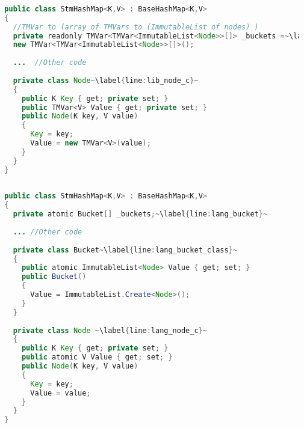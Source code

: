 \begin{lstlisting}[float,label=lst:lib_Buckets,
  caption={HashMap Buckets Array - \ac{STM} Library},
  language=Java,  
  showspaces=false,
  showtabs=false,
  breaklines=true,
  showstringspaces=false,
  breakatwhitespace=true,
  escapechar=~,
  commentstyle=\color{greencomments},
  keywordstyle=\color{bluekeywords},
  stringstyle=\color{redstrings},
  morekeywords={atomic, retry, orelse, var, get, set, ref, out, readonly}]  % Start your code-block
  
  public class StmHashMap<K,V> : BaseHashMap<K,V>
  {
    //TMVar to (array of TMVars to (ImmutableList of nodes) )
    private readonly TMVar<TMVar<ImmutableList<Node>>[]> _buckets =~\label{line:lib_bucket}~
    new TMVar<TMVar<ImmutableList<Node>>[]>();
  
    ...  //Other code
  
    private class Node~\label{line:lib_node_c}~
    {
      public K Key { get; private set; }
      public TMVar<V> Value { get; private set; }
      public Node(K key, V value)
      {
        Key = key;
        Value = new TMVar<V>(value);
      }
    }
  }
\end{lstlisting}

\begin{lstlisting}[float,label=lst:lang_Buckets,
  caption={HashMap Buckets Array - \stmname},
  language=Java,  
  showspaces=false,
  showtabs=false,
  breaklines=true,
  showstringspaces=false,
  breakatwhitespace=true,
  escapechar=~,
  commentstyle=\color{greencomments},
  keywordstyle=\color{bluekeywords},
  stringstyle=\color{redstrings},
  morekeywords={atomic, retry, orelse, var, get, set, ref, out}]  % Start your code-block
  
  public class StmHashMap<K,V> : BaseHashMap<K,V>
  {
    private atomic Bucket[] _buckets;~\label{line:lang_bucket}~
  
    ... //Other code
    
    private class Bucket~\label{line:lang_bucket_class}~
    {
      public atomic ImmutableList<Node> Value { get; set; }
      public Bucket()
      {
        Value = ImmutableList.Create<Node>();
      }
    }
  
    private class Node ~\label{line:lang_node_c}~
    {
      public K Key { get; private set; }
      public atomic V Value { get; set; }
      public Node(K key, V value)
      {
        Key = key;
        Value = value;
      }
    }
  }
\end{lstlisting}

